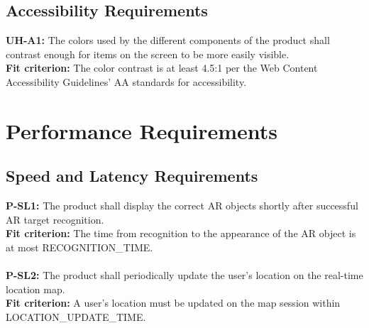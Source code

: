 \documentclass[12pt]{article}
\begin{document}
\subsection{Accessibility Requirements}
  \textbf{UH-A1:} The colors used by the different components of the product shall contrast enough for items on the screen to be more easily visible.\\
  \textbf{Fit criterion:} The color contrast is at least 4.5:1 per the Web Content Accessibility Guidelines’ AA standards for accessibility\cite{WCAG}.\\

\section{Performance Requirements}
\subsection{Speed and Latency Requirements}
  \textbf{P-SL1:} The product shall display the correct AR objects shortly after successful AR target recognition.\\
  \textbf{Fit criterion:} The time from recognition to the appearance of the AR object is at most RECOGNITION\_TIME.\\\\
  \textbf{P-SL2:} The product shall periodically update the user’s location on the real-time location map.\\
  \textbf{Fit criterion:} A user’s location must be updated on the map session within LOCATION\_UPDATE\_TIME.\\
\end{document}
